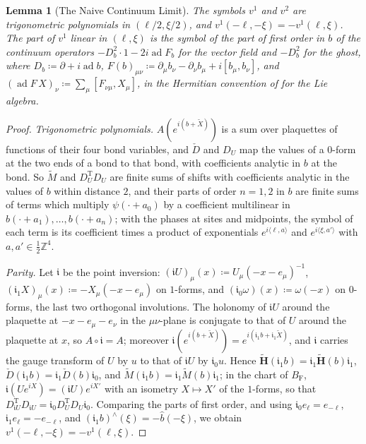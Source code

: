 \documentclass[11pt]{preprint}
\numberwithin{equation}{section}
\newtheorem{lemma}{Lemma}[section]
\theoremstyle{definition}
\theoremstyle{remark}
\theoremstyle{plain}
\begin{document}
\begin{lemma}[The Naive Continuum Limit]\label{lem:naive-continuum}
The symbols $v^1$ and $v^2$ are trigonometric polynomials in $(\ell/2, \xi/2)$, and $v^1(-\ell, -\xi) = -v^1(\ell, \xi)$. The part of $v^1$ linear in $(\ell, \xi)$ is the symbol of the part of first order in $b$ of the continuum operators $-D_b^2\cdot 1 - 2i\operatorname{ad}F_b$ for the vector field and $-D_b^2$ for the ghost, where $D_b \coloneqq \partial + i\operatorname{ad}b$, $F(b)_{\mu\nu} \coloneqq \partial_\mu b_\nu - \partial_\nu b_\mu + i[b_\mu, b_\nu]$, and $(\operatorname{ad}F\,X)_\nu \coloneqq \sum_\mu[F_{\nu\mu}, X_\mu]$, in the Hermitian convention of \cite{BalabanRG1} for the Lie algebra.
\end{lemma}

\begin{proof}
\emph{Trigonometric polynomials.} $A(e^{i(b+\tilde X)})$ is a sum over plaquettes of functions of their four bond variables, and $\check D$ and $D_U$ map the values of a $0$-form at the two ends of a bond to that bond, with coefficients analytic in $b$ at the bond. So $\tilde M$ and $D_U^{\mathrm T}D_U$ are finite sums of shifts with coefficients analytic in the values of $b$ within distance $2$, and their parts of order $n = 1, 2$ in $b$ are finite sums of terms which multiply $\psi(\cdot + a_0)$ by a coefficient multilinear in $b(\cdot + a_1), \dots, b(\cdot + a_n)$; with the phases at sites and midpoints, the symbol of each term is its coefficient times a product of exponentials $e^{i\langle\ell, a\rangle}$ and $e^{i\langle\xi, a'\rangle}$ with $a, a' \in \frac12\mathbb Z^4$.

\emph{Parity.} Let $\mathfrak i$ be the point inversion: $(\mathfrak iU)_\mu(x) \coloneqq U_\mu(-x - e_\mu)^{-1}$, $(\mathfrak i_1X)_\mu(x) \coloneqq -X_\mu(-x - e_\mu)$ on $1$-forms, and $(\mathfrak i_0\omega)(x) \coloneqq \omega(-x)$ on $0$-forms, the last two orthogonal involutions. The holonomy of $\mathfrak iU$ around the plaquette at $-x - e_\mu - e_\nu$ in the $\mu\nu$-plane is conjugate to that of $U$ around the plaquette at $x$, so $A \circ \mathfrak i = A$; moreover $\mathfrak i(e^{i(b+\tilde X)}) = e^{i(\mathfrak i_1b + \mathfrak i_1\tilde X)}$, and $\mathfrak i$ carries the gauge transform of $U$ by $u$ to that of $\mathfrak iU$ by $\mathfrak i_0u$. Hence $\tilde{\mathbf H}(\mathfrak i_1b) = \mathfrak i_1\tilde{\mathbf H}(b)\mathfrak i_1$, $\check D(\mathfrak i_1b) = \mathfrak i_1\check D(b)\mathfrak i_0$, and $\tilde M(\mathfrak i_1b) = \mathfrak i_1\tilde M(b)\mathfrak i_1$; in the chart of $B_{\mathrm F}$, $\mathfrak i(Ue^{iX}) = (\mathfrak iU)e^{iX'}$ with an isometry $X \mapsto X'$ of the $1$-forms, so that $D_{\mathfrak iU}^{\mathrm T}D_{\mathfrak iU} = \mathfrak i_0D_U^{\mathrm T}D_U\mathfrak i_0$. Comparing the parts of first order, and using $\mathfrak i_0e_\ell = e_{-\ell}$, $\mathfrak i_1e_\ell = -e_{-\ell}$, and $(\mathfrak i_1b)^\wedge(\xi) = -\hat b(-\xi)$, we obtain $v^1(-\ell, -\xi) = -v^1(\ell, \xi)$.


\end{proof}
\end{document}
